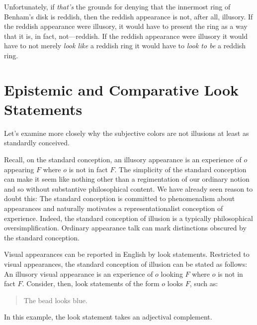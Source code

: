 \documentclass[12pt]{article}
\begin{document}
Unfortunately, if \emph{that's} the grounds for denying that the innermost ring of Benham's disk is reddish, then the reddish appearance is not, after all, illusory. If the reddish appearance were illusory, it would have to present the ring as a way that it is, in fact, not---reddish. If the reddish appearance were illusory it would have to not merely \emph{look like} a reddish ring it would have to \emph{look to be} a reddish ring.


\section{Epistemic and Comparative Look Statements}\label{sec:a_dilemma} %

Let's examine more closely why the subjective colors are not illusions at least as standardly conceived. 

Recall, on the standard conception, an illusory appearance is an experience of \( o \) appearing \( F \) where \( o \) is not in fact \( F \). The simplicity of the standard conception can make it seem like nothing other than a regimentation of our ordinary notion and so without substantive philosophical content. We have already seen reason to doubt this: The standard conception is committed to phenomenalism about appearances and naturally motivates a representationalist conception of experience. Indeed, the standard conception of illusion is a typically philosophical oversimplification. Ordinary appearance talk can mark distinctions obscured by the standard conception.

Visual appearances can be reported in English by look statements. Restricted to visual appearances, the standard conception of illusion can be stated as follows: An illusory visual appearance is an experience of \( o \) looking \( F \) where \( o \) is not in fact \( F \). Consider, then, look statements of the form \( o \) looks \( F \), such as:
	\begin{quote}
		The bead looks blue.
	\end{quote}
In this example, the look statement takes an adjectival complement. 
\end{document}
